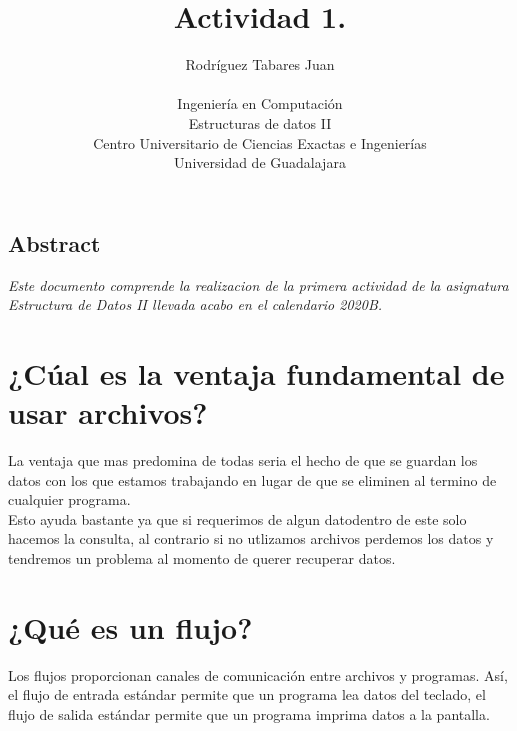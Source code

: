 \documentclass{article}
\begin{document}
\date{}

\title{\Large\bf Actividad 1.}

\author{ Rodríguez Tabares Juan \\ 
\\
  Ingeniería en Computación\\
  Estructuras de datos II \\ 
  Centro Universitario de Ciencias Exactas e Ingenierías\\
  Universidad de Guadalajara}

\maketitle


\subsection*{\centering Abstract}
\textit{Este documento comprende la realizacion de la primera actividad de la asignatura Estructura de Datos II llevada acabo en el calendario 2020B.}

\section{¿Cúal es la ventaja fundamental de usar archivos?}\label{subsec}

    La ventaja que mas predomina de todas seria el hecho de que se guardan los datos con los que estamos trabajando en lugar de que se eliminen al termino de cualquier programa. \\ 
    Esto ayuda bastante ya que si requerimos de algun datodentro de este solo hacemos la consulta, al contrario si no utlizamos archivos perdemos los datos y tendremos un problema al momento de querer recuperar datos.

\section{¿Qué es un flujo?}
    Los flujos proporcionan canales de comunicación entre archivos y programas. Así, el flujo de entrada estándar permite que un programa lea datos del teclado, el flujo de salida estándar permite que un programa imprima datos a la pantalla.
\end{document}
